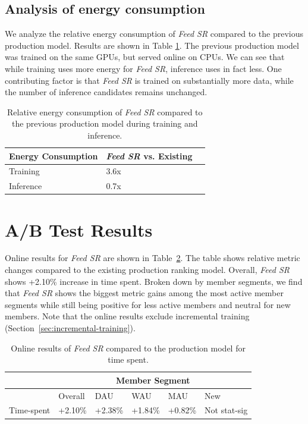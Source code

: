 \documentclass[sigconf]{acmart}
\newcommand{\systemname}{\textit{Feed SR}}
\begin{document}
\subsection{Analysis of energy consumption}
We analyze the relative energy consumption of {\systemname} compared to the previous production model. Results are shown in Table \ref{tab:energy}. The previous production model was trained on the same GPUs, but served online on CPUs. We can see that while training uses more energy for {\systemname}, inference uses in fact less. One contributing factor is that {\systemname} is trained on substantially more data, while the number of inference candidates remains unchanged.
\begin{table}[htbp]
\begin{tabular}{@{}lll@{}}
\toprule
Energy Consumption & {\systemname} vs. Existing \\ \midrule
Training           & 3.6x             \\
Inference          & 0.7x             \\ \bottomrule
\end{tabular}
\caption{Relative energy consumption of {\systemname} compared to the previous production model during training and inference.}
\label{tab:energy}
\vspace{-2.5em}
\end{table}

\section{A/B Test Results}\label{sec:online-results}
Online results for {\systemname} are shown in Table~\ref{tab:online-results}. The table shows relative metric changes compared to the existing production ranking model. Overall, {\systemname} shows +2.10\% increase in time spent. Broken down by member segments, we find that {\systemname} shows the biggest metric gains among the most active member segments while still being positive for less active members and neutral for new members. Note that the online results exclude incremental training (Section~\ref{sec:incremental-training}).

\begin{table}[h]
\begin{tabular}{@{}llllll@{}}
\toprule
           & \multicolumn{5}{c}{Member Segment}                   \\ \midrule
           & Overall & DAU     & WAU     & MAU     & New          \\
Time-spent & +2.10\% & +2.38\% & +1.84\% & +0.82\% & Not stat-sig \\ \bottomrule
\end{tabular}
\caption{Online results of {\systemname} compared to the production model for time spent.}
\label{tab:online-results}
\vspace{-2.5em}
\end{table}
\end{document}
